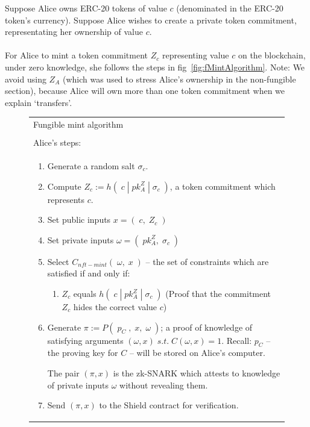 \documentclass{article}
\begin{document}
\noindent
Suppose Alice owns ERC-20 tokens of value $c$
(denominated in the ERC-20 token's currency).
Suppose Alice wishes to create a private token commitment, representating her ownership of value $c$.\\
\\
For Alice to mint a token commitment $Z_c$ representing value $c$ on the blockchain, under zero knowledge, she follows the steps in fig~\ref{fig:fMintAlgorithm}. Note: We avoid using $Z_A$ (which was used to stress Alice's ownership in the non-fungible section), because Alice will own more than one token commitment when we explain `transfers'.
\\



\newpage
\begin{figure}[H]
	\begin{center}
		\begin{framed}
      \begin{tabular}{p{16cm}}
        Fungible mint algorithm \\
        \\
        \hline
        Alice's steps:\\
        \begin{enumerate}
				  \item Generate a random salt $\sigma_c$.
				  \item Compute $Z_c := h(\;c\;|\;pk^Z_A\;|\;\sigma_c\;)$, a token commitment which represents $c$.
          \item Set public inputs $x = (\;c,\;Z_c\;)$
          \item Set private inputs $\omega = (\;pk_A^Z,\;\sigma_c\;)$
          \item Select $C_{nft-mint}(\;\omega,\;x\;)$ -- the set of constraints which are satisfied if and only if:
          \begin{enumerate}
            \item $Z_c$ equals $h(\;c\;|\;pk_A^Z\;|\;\sigma_c\;)$ (Proof that the commitment $Z_c$ hides the correct value $c$)
          \end{enumerate}
          \item Generate $\pi := P(\;p_C\;,\;x,\;\omega\;)$; a proof of knowledge of satisfying arguments $(\omega, x)\;s.t.\;C(\omega, x) = 1$. Recall: $p_C$ -- the proving key for $C$ -- will be stored on Alice's computer.

          The pair $(\pi, x)$ is the zk-SNARK which attests to knowledge of private inputs $\omega$ without revealing them.
          \item Send $(\pi, x)$ to the Shield contract for verification.


\end{enumerate}
\end{tabular}
\end{framed}
\end{center}
\end{figure}
\end{document}
